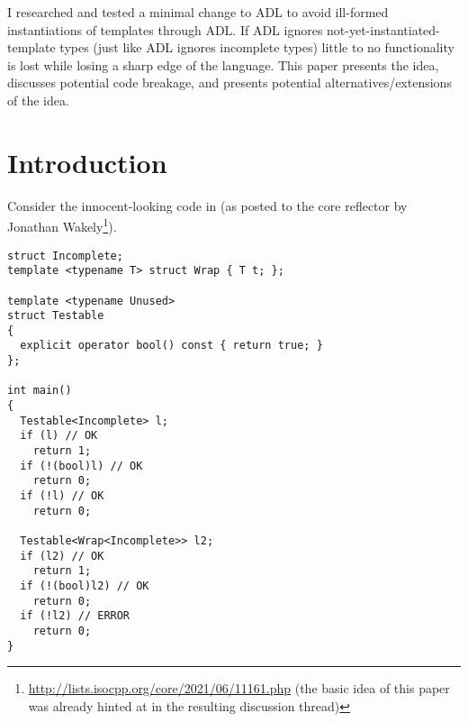 \newcommand\wgTitle{A minimal ADL restriction to avoid ill-formed template instantiation}
\newcommand\wgName{Matthias Kretz <m.kretz@gsi.de>}
\newcommand\wgDocumentNumber{D2600R0}
\newcommand\wgGroup{EWGI, EWG}
\newcommand\wgTarget{\CC{}26}

\usepackage{mymacros}
\usepackage{wg21}
\usepackage{changelog}
\usepackage{underscore}



\newcommand\wglink[1]{\href{https://wg21.link/#1}{#1}}
\newcommand\notyetinstantiated{not\hyp{}yet\hyp{}instantiated\hyp{}template}


\begin{wgTitlepage}
  I researched and tested a minimal change to ADL to avoid ill-formed instantiations of 
  templates through ADL. If ADL ignores \notyetinstantiated{} types (just like ADL ignores 
  incomplete types) little to no functionality is lost while losing a sharp edge of the 
  language. This paper presents the idea, discusses potential code breakage, and presents 
  potential alternatives/extensions of the idea.
\end{wgTitlepage}

\pagestyle{scrheadings}

%

%

\section{Introduction}

Consider the innocent-looking code in  (as posted to the core reflector by 
Jonathan Wakely\footnote{\url{http://lists.isocpp.org/core/2021/06/11161.php} (the basic 
idea of this paper was already hinted at in the resulting discussion thread)}).
\begin{lstlisting}[style=Vc,float={hb},label=lst:example1,caption={
Ill-formed instantiation of \type{Wrap<Incomplete>} because of ADL
}]
struct Incomplete;
template <typename T> struct Wrap { T t; };

template <typename Unused>
struct Testable
{
  explicit operator bool() const { return true; }
};

int main()
{
  Testable<Incomplete> l;
  if (l) // OK
    return 1;
  if (!(bool)l) // OK
    return 0;
  if (!l) // OK
    return 0;

  Testable<Wrap<Incomplete>> l2;
  if (l2) // OK
    return 1;
  if (!(bool)l2) // OK
    return 0;
  if (!l2) // ERROR
    return 0;
}
\end{lstlisting}

